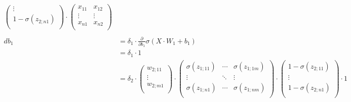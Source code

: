 \begin{align*}
\begin{pmatrix}
                                                                \vdots \\
                                                                1-\sigma (z_{2;n1})  \\
                                                                \end{pmatrix} \cdot \begin{pmatrix}
                                                                                         x_{11} & x_{12}\\
                                                                                         \vdots & \vdots\\
                                                                                         x_{n1} & x_{n2}\\
                                                                                        \end{pmatrix} \\\\
    db_{1} &= \delta_{1} \cdot \frac{\partial}{\partial b_{1}}\sigma(X\cdot W_{1}+b_{1})\\
    &= \delta_{1} \cdot 1\\
    &= \delta_{2} \cdot \begin{pmatrix}
                        w_{2;11} \\
                        \vdots \\
                        w_{2;m1} \\
                        \end{pmatrix} \cdot \begin{pmatrix}
                                            \sigma (z_{1;11})& \cdots & \sigma(z_{1;1m}) \\
                                            \vdots & \ddots &\vdots\\
                                            \sigma (z_{1;n1}) & \cdots & \sigma (z_{1;nm})  \\
                                            \end{pmatrix} \cdot \begin{pmatrix}
                                                                1-\sigma (z_{2;11}) \\
                                                                \vdots \\
                                                                1-\sigma (z_{2;n1})  \\
                                                                \end{pmatrix} \cdot 1
\end{align*}
